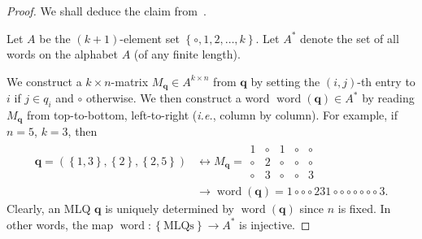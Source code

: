 \documentclass[reqno]{amsart}
\newcommand{\0}{\phantom{c}}
\DeclareMathOperator{\word}{word} %
\newcommand{\qq}{\mathbf{q}}
\newcommand{\set}[1]{\left\{ #1 \right\}}
\newcommand{\tup}[1]{\left( #1 \right)}
\theoremstyle{plain}
\theoremstyle{definition}
\numberwithin{equation}{section}
\begin{document}
\begin{proof}
We shall deduce the claim from~\cite[Ch.~5, (5.6.3)]{Loth}.

Let $A$ be the $\tup{k+1}$-element set $\set{\circ, 1, 2, \ldots, k}$.
Let $A^*$ denote the set of all words on the alphabet $A$
(of any finite length).

We construct a $k \times n$-matrix $M_{\qq} \in A^{k \times n}$ from $\qq$ by setting the $\tup{i, j}$-th
entry to $i$ if $j \in q_i$ and $\circ$ otherwise.
We then construct a word $\word(\qq) \in A^*$ by reading $M_{\qq}$ from top-to-bottom, left-to-right (\textit{i.e.}, column by column).
For example, if $n = 5$, $k = 3$, then
\begin{align*}
\qq = \tup{\set{1, 3}, \set{2},
\set{2, 5}}
& \longleftrightarrow
 M_{\qq}
 =
 \begin{array}{ccccc}
  1 & \circ & 1 & \circ & \circ \\
  \circ & 2 & \circ  & \circ & \circ \\
  \circ & 3  & \circ & \circ & 3
 \end{array}
 \\ & \longrightarrow
 \word(\qq) = 1 \circ \circ \circ 2 3 1 \circ \circ \circ \circ \circ \circ \circ 3 .
\end{align*}
Clearly, an MLQ $\qq$ is uniquely determined by $\word(\qq)$ since $n$ is fixed.
In other words, the map $\word \colon \set{\text{MLQs}} \to A^*$
is injective.


\end{proof}
\end{document}
